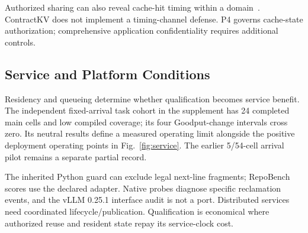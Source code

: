 Authorized sharing can also reveal cache-hit timing within a domain~\cite{iknow2025,auditing2025}. ContractKV does not implement a timing-channel defense. P4 governs cache-state authorization; comprehensive application confidentiality requires additional controls.

\subsection{Service and Platform Conditions}
Residency and queueing determine whether qualification becomes service benefit. The independent fixed-arrival task cohort in the supplement has 24 completed main cells and low compiled coverage; its four Goodput-change intervals cross zero. Its neutral results define a measured operating limit alongside the positive deployment operating points in Fig.~\ref{fig:service}. The earlier 5/54-cell arrival pilot remains a separate partial record.

The inherited Python guard can exclude legal next-line fragments; RepoBench scores use the declared adapter. Native probes diagnose specific reclamation events, and the vLLM 0.25.1 interface audit is not a port. Distributed services need coordinated lifecycle/publication. Qualification is economical where authorized reuse and resident state repay its service-clock cost.
